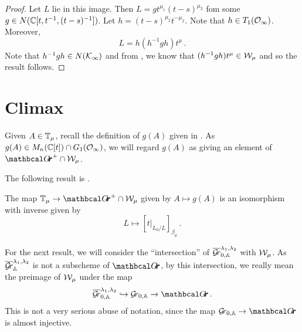 \documentclass[draft]{article}
\begin{document}
\begin{proof}
    Let $ L $ lie in this image.  Then $ L = g t^{\mu_1} (t-s)^{\mu_2}$ fom some $ g \in N(\mathbb C[t, t^{-1}, (t-s)^{-1}]) $.  Let $ h =(t-s)^{\mu_2} t^{-\mu_2}  $.  Note that $ h \in T_1(\mathcal O_\infty)$. 
    Moreover,
    $$ L = h (h^{-1} g h) t^{\mu}\,. $$
    Note that 
    $h^{-1} g h \in N(\mathcal K_\infty)$ and from \cite{kamnitzer2014yangians} 
    , we know that $ (h^{-1} g h) t^{\mu} \in \mathcal W_\mu$ and so the result follows.

    \end{proof}

\section{Climax}
Given $ A \in \mathbb T_\mu$, recall the definition of $ g(A)$ given in .
As $ g(A) \in M_n(\mathbb C[t]) \cap G_1(\mathcal O_\infty)$, we will regard $ g(A)$ as giving an element of $ \Grth^+ \cap \cW_\mu$.

The following result is \cite[Theorem 3.2]{cautis2018categorical}.

\begin{theorem} \label{th:TmuWmu}
The map $ \TT_\mu \rightarrow \Grth^+ \cap \cW_\mu $ given by $ A \mapsto g(A) $ is an isomorphism with inverse given by
$$ L \mapsto [t|_{L_0/L} ]_{\beta_\mu} \,. $$
\end{theorem}


For the next result, we will consider the ``intersection'' of $ \overline{\mathcal{G}\!r}^{\lambda_1, \lambda_2}_{0,\mathbb A} $ with $\mathcal W_\mu$.  
As $  \overline{\mathcal{G}\!r}^{\lambda_1, \lambda_2}_\mathbb A $ is not a subscheme of $ \Grth$, by this intersection, we really mean the preimage of $ \mathcal W_\mu$ under the map 
$$ 
\overline{\Gr}^{\lambda_1, \lambda_2}_{0,\AA}  \hookrightarrow \Grbd \rightarrow \Grth\,.
$$
This is not a very serious abuse of notation, since the map $ \Grbd \rightarrow \Grth $ is almost injective. 
\end{document}
